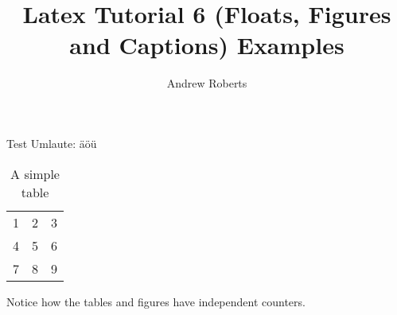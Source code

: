 \documentclass[english]{article}
\begin{document}
\title{Latex Tutorial 6 (Floats, Figures and Captions) Examples}
\author{Andrew Roberts}
\maketitle

Test Umlaute:
äöü
\begin{table}[htp]
  \begin{center}
    \begin{tabular}{| l c r |}
    \hline
    1 & 2 & 3 \\
    4 & 5 & 6 \\
    7 & 8 & 9 \\
    \hline
    \end{tabular}
  \end{center}
  \caption{A simple table}
\end{table}

Notice how the tables and figures have independent counters.
\end{document}
